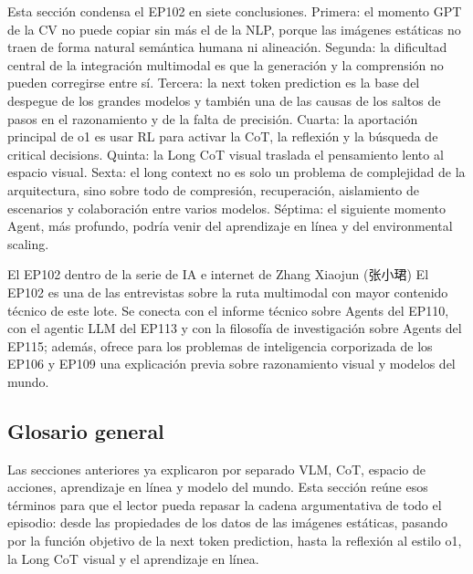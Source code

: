 \documentclass[a4paper]{article}
\begin{document}
Esta sección condensa el EP102 en siete conclusiones. Primera: el momento GPT de la CV no puede copiar sin más el de la NLP, porque las imágenes estáticas no traen de forma natural semántica humana ni alineación. Segunda: la dificultad central de la integración multimodal es que la generación y la comprensión no pueden corregirse entre sí. Tercera: la next token prediction es la base del despegue de los grandes modelos y también una de las causas de los saltos de pasos en el razonamiento y de la falta de precisión. Cuarta: la aportación principal de o1 es usar RL para activar la CoT, la reflexión y la búsqueda de critical decisions. Quinta: la Long CoT visual traslada el pensamiento lento al espacio visual. Sexta: el long context no es solo un problema de complejidad de la arquitectura, sino sobre todo de compresión, recuperación, aislamiento de escenarios y colaboración entre varios modelos. Séptima: el siguiente momento Agent, más profundo, podría venir del aprendizaje en línea y del environmental scaling.

\begin{importantbox}{El EP102 dentro de la serie de IA e internet de Zhang Xiaojun (张小珺)}
El EP102 es una de las entrevistas sobre la ruta multimodal con mayor contenido técnico de este lote. Se conecta con el informe técnico sobre Agents del EP110, con el agentic LLM del EP113 y con la filosofía de investigación sobre Agents del EP115; además, ofrece para los problemas de inteligencia corporizada de los EP106 y EP109 una explicación previa sobre razonamiento visual y modelos del mundo.
\end{importantbox}

\subsection{Glosario general}

Las secciones anteriores ya explicaron por separado VLM, CoT, espacio de acciones, aprendizaje en línea y modelo del mundo. Esta sección reúne esos términos para que el lector pueda repasar la cadena argumentativa de todo el episodio: desde las propiedades de los datos de las imágenes estáticas, pasando por la función objetivo de la next token prediction, hasta la reflexión al estilo o1, la Long CoT visual y el aprendizaje en línea.
\end{document}
